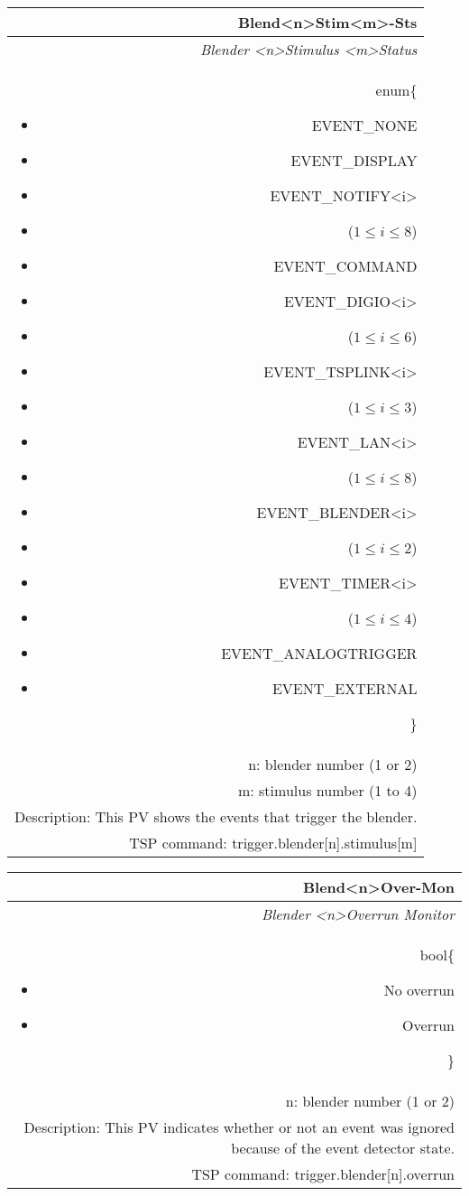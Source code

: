 \documentclass[openany]{article}
\begin{document}
		\begin{tabular}{N}
			\hline
			\bfseries Blend{\textless n\textgreater}Stim{\textless m\textgreater}-Sts\label{pv:blendstim-sts} \\ \hline
			\emph{Blender \textless n\textgreater Stimulus \textless m\textgreater Status} \\
			enum\{\begin{itemize}[noitemsep]
				\small
				\item[] EVENT\_NONE
				\item[] EVENT\_DISPLAY
				\item[] EVENT\_NOTIFY\textless i\textgreater
				\item[] ($1\leq i\leq 8$)
				\item[] EVENT\_COMMAND
				\item[] EVENT\_DIGIO\textless i\textgreater
				\item[] ($1\leq i\leq 6$)
				\item[] EVENT\_TSPLINK\textless i\textgreater
				\item[] ($1\leq i\leq 3$)
				\item[] EVENT\_LAN\textless i\textgreater
				\item[] ($1\leq i\leq 8$)
				\item[] EVENT\_BLENDER\textless i\textgreater 
				\item[] ($1\leq i\leq 2$)
				\item[] EVENT\_TIMER\textless i\textgreater
				\item[] ($1\leq i\leq 4$)
				\item[] EVENT\_ANALOGTRIGGER
				\item[] EVENT\_EXTERNAL
			\end{itemize}\} \\
			n: blender number (1 or 2) \\
			m: stimulus number (1 to 4) \\
			Description: This PV shows the events that trigger the blender. \\
			TSP command: trigger.blender[n].stimulus[m]
		\end{tabular}

		\begin{tabular}{N}
			\hline
			\bfseries Blend{\textless n\textgreater}Over-Mon\label{pv:blendover-mon} \\ \hline
			\emph{Blender \textless n\textgreater Overrun Monitor} \\
			bool\{\begin{itemize}[noitemsep]
				\small
				\item[] No overrun
				\item[] Overrun
			\end{itemize}\} \\
			n: blender number (1 or 2) \\
			Description: This PV indicates whether or not an event was ignored because of the event detector state. \\
			TSP command: trigger.blender[n].overrun
		\end{tabular}
\end{document}
